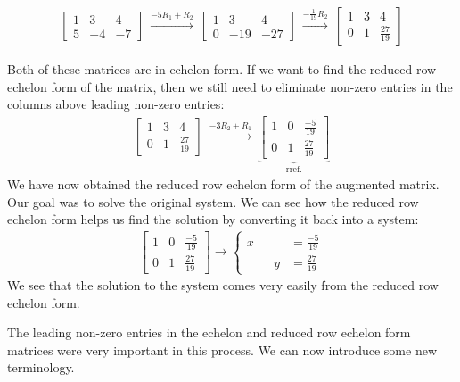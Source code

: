 \documentclass[11pt]{article}
\begin{document}
\begin{align*}
\left[\begin{matrix}
1 & 3 & 4
\\[.4em]
5 & -4 & -7
\end{matrix}\right]
\
\xrightarrow[]{-5R_1 + R_2}
\
\left[\begin{matrix}
1 & 3 & 4
\\[.4em]
0 & -19 & -27
\end{matrix}\right]
\
\xrightarrow[]{-\frac{1}{19} R_2}
\
\left[\begin{matrix}
1 & 3 & 4
\\[.4em]
0 & 1 & \frac{27}{19}
\end{matrix}\right]
\end{align*}

Both of these matrices are in echelon form. If we want to find the reduced row echelon form of the matrix, then we still need to eliminate non-zero entries in the columns above leading non-zero entries:
\begin{align*}
\left[\begin{matrix}
1 & 3 & 4
\\[.4em]
0 & 1 & \frac{27}{19}
\end{matrix}\right]
\
\xrightarrow[]{-3R_2 + R_1}
\
\underbrace{
\left[\begin{matrix}
1 & 0 & \frac{-5}{19}
\\[.4em]
0 & 1 & \frac{27}{19}
\end{matrix}\right]
}_{\text{rref.}}
\end{align*}
We have now obtained the reduced row echelon form of the augmented matrix. Our goal was to solve the original system. We can see how the reduced row echelon form helps us find the solution by converting it back into a system:
\begin{align*}
\left[\begin{matrix}
1 & 0 & \frac{-5}{19}
\\[.4em]
0 & 1 & \frac{27}{19}
\end{matrix}\right]
\longrightarrow
\left\{
\begin{aligned}
x & & &= \frac{-5}{19}
\\[.4em]
&&y &= \frac{27}{19}
\end{aligned}
\right.
\end{align*}
We see that the solution to the system comes very easily from the reduced row echelon form.

The leading non-zero entries in the echelon and reduced row echelon form matrices were very important in this process. We can now introduce some new terminology.
\end{document}
